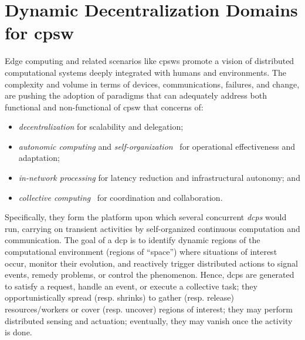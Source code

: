 \newcommand{\casename}[0]{{\sc{}FloodWatch}}


\newcommand{\revise}[1]{{#1}}
\newcommand{\revisetwo}[1]{{#1}}


\chapter[Dynamic Decentralization Domains]{Dynamic Decentralization Domains for \acf{cpsw}}
\minitoc%
Edge computing
 and related scenarios
 like \acp{cpsw}
 promote a vision of
 distributed computational systems 
 deeply integrated with
 humans and environments.
% 
%
The complexity and volume in terms of devices, communications, failures, and change,
 are pushing the adoption of paradigms 
 that can %
 adequately address both functional
 and non-functional of \ac{cpsw} that concerns of:
\begin{itemize}
  \item \emph{decentralization} for scalability and delegation;
  \item \emph{autonomic computing} and \emph{self-organization}~\cite{DBLP:journals/computer/KephartC03} for operational effectiveness and adaptation;
  \item \emph{in-network processing} for latency reduction and infrastructural autonomy; and
  \item \emph{collective computing}~\cite{DBLP:journals/eaai/CasadeiVAPD21} for coordination and collaboration.
\end{itemize}

Specifically, they form the platform %
 upon which several concurrent
 \emph{\acp{dcp}} 
 would run, carrying on transient activities
 by self-organized continuous computation and communication. %
%
The goal of a \ac{dcp} is to identify dynamic regions of the computational environment (regions of ``space'') where
situations of interest occur,
monitor their evolution,
and reactively trigger distributed actions to signal events,
remedy problems,
or control the phenomenon.
%
Hence, \acp{dcp}
 are generated
 to satisfy a request,
 handle an event, or 
 execute a collective task;
 they opportunistically spread (resp. shrinks)
 to gather (resp. release) resources/workers
 or cover (resp. uncover) regions of interest;
 they may perform 
 distributed sensing and actuation;
eventually, they may vanish once the activity is done.
 
